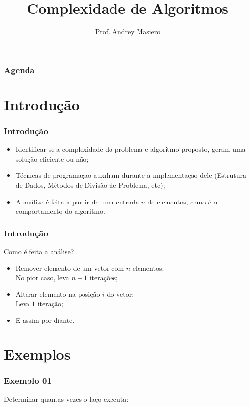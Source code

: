 \documentclass{beamer}
\begin{document}
\title[Complexidade]{Complexidade de Algoritmos}
\author{Prof. Andrey Masiero}

\begin{frame}
  \titlepage
\end{frame}

\begin{frame}
  \frametitle{Agenda}
  \tableofcontents
\end{frame}

\section{Introdução}

\begin{frame}
	\frametitle{Introdução}
    \begin{itemize}[<+->]
        \item Identificar se a complexidade do problema e algoritmo proposto, geram uma solução eficiente ou não;
        \item Técnicas de programação auxiliam durante a implementação dele (Estrutura de Dados, Métodos de Divisão de Problema, etc);
        \item A análise é feita a partir de uma entrada $n$ de elementos, como é o comportamento do algoritmo.
    \end{itemize}
\end{frame}

\begin{frame}
	\frametitle{Introdução}
    Como é feita a análise?
    \begin{itemize}[<+->]
        \item Remover elemento de um vetor com $n$ elementos: \\ No pior caso, leva $n-1$ iterações;
        \item Alterar elemento na posição $i$ do vetor: \\ Leva $1$ iteração;
        \item E assim por diante.
    \end{itemize}
\end{frame}

\section{Exemplos}

\begin{frame}
	\frametitle{Exemplo 01}
    Determinar quantas vezes o laço executa:
    
\end{frame}
\end{document}
